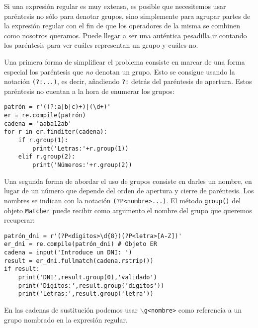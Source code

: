Si una expresión regular es muy extensa, es posible que necesitemos usar paréntesis no sólo para denotar grupos, sino simplemente para agrupar partes de la expresión regular con el fin de que los operadores de la misma se combinen como nosotros queramos. Puede llegar a ser una auténtica pesadilla ir contando los paréntesis para ver cuáles representan un grupo y cuáles no. 

Una primera forma de simplificar el problema consiste en marcar de una forma especial los paréntesis que \emph{no} denotan un grupo. Esto se consigue usando la notación \texttt{(?:...)}, es decir, añadiendo \texttt{?:} detrás del paréntesis de apertura. Estos paréntesis no cuentan a la hora de enumerar los grupos:

\begin{lstlisting}
patrón = r'((?:a|b|c)+)|(\d+)'
er = re.compile(patrón)
cadena = 'aaba12ab'
for r in er.finditer(cadena):
    if r.group(1):
        print('Letras:'+r.group(1))
    elif r.group(2):
        print('Números:'+r.group(2))
\end{lstlisting}

Una segunda forma de abordar el uso de grupos consiste en darles un nombre, en lugar de un número que depende del orden de apertura y cierre de paréntesis. Los nombres se indican con la notación \texttt{(?P<nombre>...)}. El método \texttt{group()} del objeto \texttt{Matcher} puede recibir como argumento el nombre del grupo que queremos recuperar:

\begin{lstlisting}
patrón_dni = r'(?P<digitos>\d{8})(?P<letra>[A-Z])' 
er_dni = re.compile(patrón_dni) # Objeto ER
cadena = input('Introduce un DNI: ')
result = er_dni.fullmatch(cadena.rstrip())
if result:
    print('DNI',result.group(0),'validado')
    print('Dígitos:',result.group('digitos'))
    print('Letras:',result.group('letra'))
\end{lstlisting}

En las cadenas de sustitución podemos usar \texttt{$\backslash$g<nombre>} como referencia a un grupo nombrado en la expresión regular.
